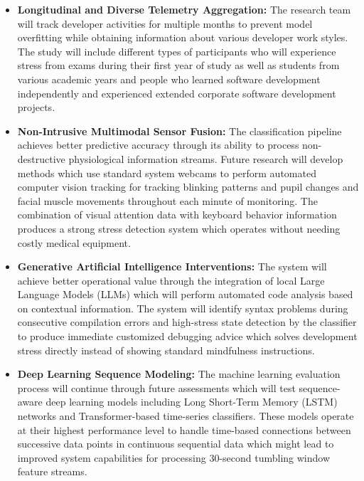 \begin{itemize}
    \item \textbf{Longitudinal and Diverse Telemetry Aggregation:} The research team will track developer activities for multiple months to prevent model overfitting while obtaining information about various developer work styles. The study will include different types of participants who will experience stress from exams during their first year of study as well as students from various academic years and people who learned software development independently and experienced extended corporate software development projects.

    \item \textbf{Non-Intrusive Multimodal Sensor Fusion:} The classification pipeline achieves better predictive accuracy through its ability to process non-destructive physiological information streams. Future research will develop methods which use standard system webcams to perform automated computer vision tracking for tracking blinking patterns and pupil changes and facial muscle movements throughout each minute of monitoring. The combination of visual attention data with keyboard behavior information produces a strong stress detection system which operates without needing costly medical equipment.

    \item \textbf{Generative Artificial Intelligence Interventions:} The system will achieve better operational value through the integration of local Large Language Models (LLMs) which will perform automated code analysis based on contextual information. The system will identify syntax problems during consecutive compilation errors and high-stress state detection by the classifier to produce immediate customized debugging advice which solves development stress directly instead of showing standard mindfulness instructions.

    \item \textbf{Deep Learning Sequence Modeling:} The machine learning evaluation process will continue through future assessments which will test sequence-aware deep learning models including Long Short-Term Memory (LSTM) networks and Transformer-based time-series classifiers. These models operate at their highest performance level to handle time-based connections between successive data points in continuous sequential data which might lead to improved system capabilities for processing 30-second tumbling window feature streams.
\end{itemize}

